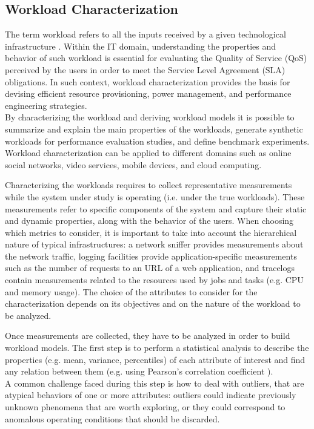 \documentclass[a4paper, 12pt]{article} %
\begin{document}
	\subsection{Workload Characterization} \label{ssec:workload_characterization}
	The term workload refers to all the inputs received by a given technological infrastructure \cite{WorkloadCharacterization}. Within the IT domain, understanding the properties and behavior of such workload is essential for evaluating the Quality of Service (QoS) perceived by the users in order to meet the Service Level Agreement (SLA) obligations. In such context, workload characterization provides the basis for devising efficient resource provisioning, power management, and performance engineering strategies.\\
	By characterizing the workload and deriving workload models it is possible to summarize and explain the main properties of the workloads, generate synthetic workloads for performance evaluation studies, and define benchmark experiments. Workload characterization can be applied to different domains such as online social networks, video services, mobile devices, and cloud computing.
	
	Characterizing the workloads requires to collect representative measurements while the system under study is operating (i.e. under the true workloads). These measurements refer to specific components of the system and capture their static and dynamic properties, along with the behavior of the users. When choosing which metrics to consider, it is important to take into account the hierarchical nature of typical infrastructures: a network sniffer provides measurements about the network traffic, logging facilities provide application-specific measurements such as the number of requests to an URL of a web application, and tracelogs contain measurements related to the resources used by jobs and tasks (e.g. CPU and memory usage). The choice of the attributes to consider for the characterization depends on its objectives and on the nature of the workload to be analyzed.
	
	Once measurements are collected, they have to be analyzed in order to build workload models. The first step is to perform a statistical analysis to describe the properties (e.g. mean, variance, percentiles) of each attribute of interest and find any relation between them (e.g. using Pearson's correlation coefficient \cite{PearsonCoefficient}). \\
	A common challenge faced during this step is how to deal with outliers, that are atypical behaviors of one or more attributes: outliers could indicate previously unknown phenomena that are worth exploring, or they could correspond to anomalous operating conditions that should be discarded.
	
\end{document}
